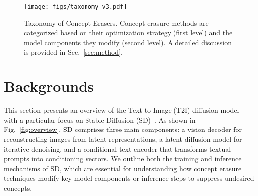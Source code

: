 \begin{figure}[t]
    \centering
    \texttt{[image: figs/taxonomy\_v3.pdf]}
    \caption{
    Taxonomy of Concept Erasers. Concept erasure methods are categorized based on their optimization strategy (first level) and the model components they modify (second level). A detailed discussion is provided in Sec.~\ref{sec:method}.
    }
    \label{fig:taxonomy}
\end{figure}

\section{Backgrounds} \label{sec:preliminaries}

This section presents an overview of the Text-to-Image (T2I) diffusion model with a particular focus on Stable Diffusion (SD)~\cite{stable_diffusion}. %
As shown in Fig.~\ref{fig:overview}, SD comprises three main components: a vision decoder for reconstructing images from latent representations, a latent diffusion model for iterative denoising, and a conditional text encoder that transforms textual prompts into conditioning vectors.
We outline both the training and inference mechanisms of SD, which are essential for understanding how concept erasure techniques modify key model components or inference steps to suppress undesired concepts.

